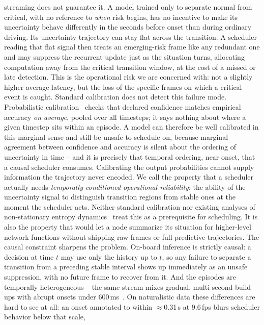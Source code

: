 \documentclass[a4paper,fleqn]{cas-dc}
\begin{document}
streaming does not guarantee it. A model trained only to separate normal from
critical, with no reference to \emph{when} risk begins, has no incentive to make its
uncertainty behave differently in the seconds before onset than during ordinary
driving. Its uncertainty trajectory can stay flat across the transition. A scheduler
reading that flat signal then treats an emerging-risk frame like any redundant one
and may suppress the recurrent update just as the situation turns, allocating computation away from the critical transition window, at the cost of a missed or late detection. This is the operational risk we are concerned with: not a slightly
higher average latency, but the loss of the specific frames on which a critical
event is caught.
Standard calibration does not detect this failure mode. Probabilistic
calibration~\cite{guo2017calibration} checks that declared confidence matches
empirical accuracy \emph{on average}, pooled over all timesteps; it says nothing
about where a given timestep sits within an episode. A model can therefore be
well calibrated in this marginal sense and still be unsafe to schedule on, because
marginal agreement between confidence and accuracy is silent about the ordering of
uncertainty in time -- and it is precisely that temporal ordering, near onset, that
a causal scheduler consumes. Calibrating the output probabilities cannot supply
information the trajectory never encoded.
We call the property that a scheduler actually needs \emph{temporally conditioned
operational reliability}: the ability of the uncertainty signal to distinguish
transition regions from stable ones at the moment the scheduler acts. Neither
standard calibration nor existing analyses of non-stationary entropy
dynamics~\cite{braverman2020calib,dera2023trust} treat this as a prerequisite for
scheduling. It is also the property that would let a node summarize its situation
for higher-level network functions without shipping raw frames or full predictive
trajectories.
The causal constraint sharpens the problem. On-board inference is strictly causal:
a decision at time $t$ may use only the history up to $t$, so any failure to
separate a transition from a preceding stable interval shows up immediately as an
unsafe suppression, with no future frame to recover from it. And the episodes are
temporally heterogeneous -- the same stream mixes gradual, multi-second build-ups
with abrupt onsets under $600$\,ms~\cite{dingus2016shrp2,bouhsissin2023driver}. On
naturalistic data these differences are hard to see at all: an onset annotated to
within $\approx$0.31\,s at 9.6\,fps blurs scheduler behavior below that scale,
\end{document}
